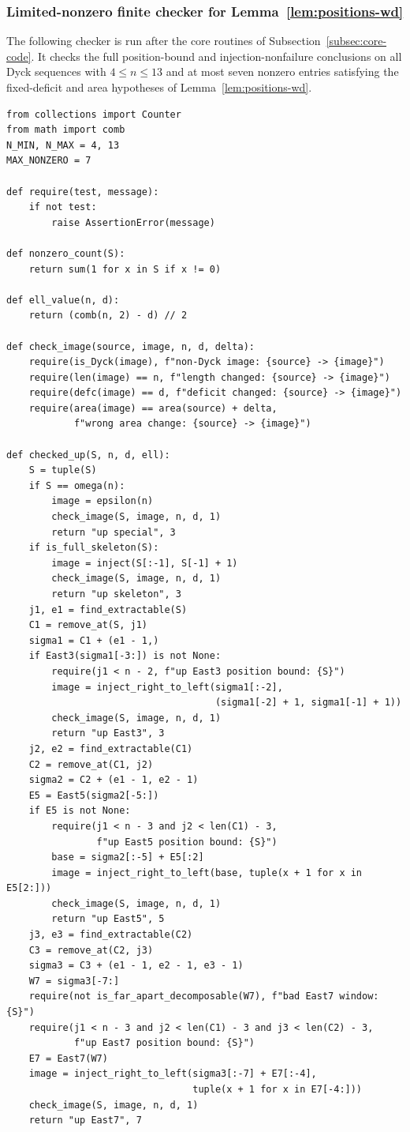\documentclass[11pt]{article}
\theoremstyle{plain}
\theoremstyle{definition}
\theoremstyle{remark}
\begin{document}
\subsubsection*{Limited-nonzero finite checker for Lemma~\ref{lem:positions-wd}}
The following checker is run after the core routines of
Subsection~\ref{subsec:core-code}.  It checks the full position-bound and
injection-nonfailure conclusions on all Dyck sequences with \(4\le n\le 13\)
and at most seven nonzero entries satisfying the fixed-deficit and area
hypotheses of Lemma~\ref{lem:positions-wd}.
\begin{lstlisting}
from collections import Counter
from math import comb
N_MIN, N_MAX = 4, 13
MAX_NONZERO = 7

def require(test, message):
    if not test:
        raise AssertionError(message)

def nonzero_count(S):
    return sum(1 for x in S if x != 0)

def ell_value(n, d):
    return (comb(n, 2) - d) // 2

def check_image(source, image, n, d, delta):
    require(is_Dyck(image), f"non-Dyck image: {source} -> {image}")
    require(len(image) == n, f"length changed: {source} -> {image}")
    require(defc(image) == d, f"deficit changed: {source} -> {image}")
    require(area(image) == area(source) + delta,
            f"wrong area change: {source} -> {image}")

def checked_up(S, n, d, ell):
    S = tuple(S)
    if S == omega(n):
        image = epsilon(n)
        check_image(S, image, n, d, 1)
        return "up special", 3
    if is_full_skeleton(S):
        image = inject(S[:-1], S[-1] + 1)
        check_image(S, image, n, d, 1)
        return "up skeleton", 3
    j1, e1 = find_extractable(S)
    C1 = remove_at(S, j1)
    sigma1 = C1 + (e1 - 1,)
    if East3(sigma1[-3:]) is not None:
        require(j1 < n - 2, f"up East3 position bound: {S}")
        image = inject_right_to_left(sigma1[:-2],
                                     (sigma1[-2] + 1, sigma1[-1] + 1))
        check_image(S, image, n, d, 1)
        return "up East3", 3
    j2, e2 = find_extractable(C1)
    C2 = remove_at(C1, j2)
    sigma2 = C2 + (e1 - 1, e2 - 1)
    E5 = East5(sigma2[-5:])
    if E5 is not None:
        require(j1 < n - 3 and j2 < len(C1) - 3,
                f"up East5 position bound: {S}")
        base = sigma2[:-5] + E5[:2]
        image = inject_right_to_left(base, tuple(x + 1 for x in E5[2:]))
        check_image(S, image, n, d, 1)
        return "up East5", 5
    j3, e3 = find_extractable(C2)
    C3 = remove_at(C2, j3)
    sigma3 = C3 + (e1 - 1, e2 - 1, e3 - 1)
    W7 = sigma3[-7:]
    require(not is_far_apart_decomposable(W7), f"bad East7 window: {S}")
    require(j1 < n - 3 and j2 < len(C1) - 3 and j3 < len(C2) - 3,
            f"up East7 position bound: {S}")
    E7 = East7(W7)
    image = inject_right_to_left(sigma3[:-7] + E7[:-4],
                                 tuple(x + 1 for x in E7[-4:]))
    check_image(S, image, n, d, 1)
    return "up East7", 7


\end{lstlisting}
\end{document}
